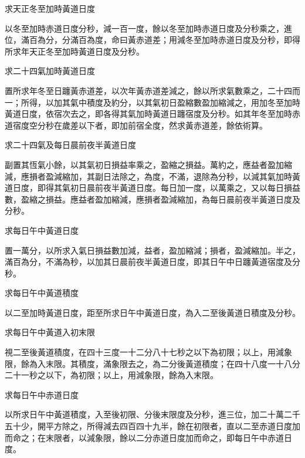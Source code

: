 \begin{pinyinscope}
 求天正冬至加時黃道日度



 以冬至加時赤道日度分秒，減一百一度，餘以冬至加時赤道日度及分秒乘之，進位，滿百為分，分滿百為度，命曰黃赤道差；用減冬至加時赤道日度及分秒，即得所求年天正冬至加時黃道日度及分秒。



 求二十四氣加時黃道日度



 置所求年冬至日躔黃赤道差，以次年黃赤道差減之，餘以所求氣數乘之，二十四而一；所得，以加其氣中積度及約分，以其氣初日盈縮數盈加縮減之，用加冬至加時黃道日度，依宿次去之，即各得其氣加時黃道日躔宿度及分秒。如其年冬至加時赤道宿度空分秒在歲差以下者，即加前宿全度，然求黃赤道差，餘依術算。



 求二十四氣及每日晨前夜半黃道日度



 副置其恆氣小餘，以其氣初日損益率乘之，盈縮之損益。萬約之，應益者盈加縮減，應損者盈減縮加，其副日法除之，為度，不滿，退除為分秒，以減其氣加時黃道日度，即得其氣初日晨前夜半黃道日度。每日加一度，以萬乘之，又以每日損益數，盈縮之損益。應益者盈加縮減，應損者盈減縮加，為每日晨前夜半黃道日度及分秒。



 求每日午中黃道日度



 置一萬分，以所求入氣日損益數加減，益者，盈加縮減；損者，盈減縮加。半之，滿百為分，不滿為秒，以加其日晨前夜半黃道日度，即其日午中日躔黃道宿度及分秒。



 求每日午中黃道積度



 以二至加時黃道日度，距至所求日午中黃道日度，為入二至後黃道日積度及分秒。



 求每日午中黃道入初末限



 視二至後黃道積度，在四十三度一十二分八十七秒之以下為初限；以上，用減象限，餘為入末限。其積度，滿象限去之，為二分後黃道積度；在四十八度一十八分二十一秒之以下，為初限；以上，用減象限，餘為入末限。



 求每日午中赤道日度



 以所求日午中黃道積度，入至後初限、分後末限度及分秒，進三位，加二十萬二千五十少，開平方除之，所得減去四百四十九半，餘在初限者，直以二至赤道日度加而命之；在末限者，以減象限，餘以二分赤道日度加而命之，即每日午中赤道日度。




\end{pinyinscope}
